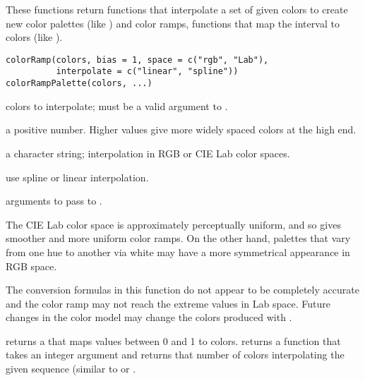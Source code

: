 %
\begin{Description}\relax
These functions return functions that interpolate a set of given
colors to create new color palettes (like ) and
color ramps, functions that map the interval \eqn{[0, 1]}{} to colors
(like ).
\end{Description}
%
\begin{Usage}
\begin{verbatim}
colorRamp(colors, bias = 1, space = c("rgb", "Lab"),
          interpolate = c("linear", "spline"))
colorRampPalette(colors, ...)
\end{verbatim}
\end{Usage}
%
\begin{Arguments}
\begin{ldescription}
\item[\code{colors}] colors to interpolate; must be a valid argument to
.
\item[\code{bias}] a positive number.  Higher values give more widely spaced
colors at the high end.
\item[\code{space}] a character string; interpolation in RGB or CIE Lab
color spaces.
\item[\code{interpolate}] use spline or linear interpolation.
\item[\code{...}] arguments to pass to .
\end{ldescription}
\end{Arguments}
%
\begin{Details}\relax
The CIE Lab color space is approximately perceptually uniform, and so
gives smoother and more uniform color ramps. On the other hand,
palettes that vary from one hue to another via white may have a more
symmetrical appearance in RGB space.

The conversion formulas in this function do not appear to be
completely accurate and the color ramp may not reach the extreme
values in Lab space.  Future changes in the \R{} color model may change
the colors produced with .
\end{Details}
%
\begin{Value}
 returns a  that maps values between 0 and 1
to colors.
 returns a function that takes an integer
argument and returns that number of colors interpolating the given
sequence (similar to  or
.
\end{Value}
